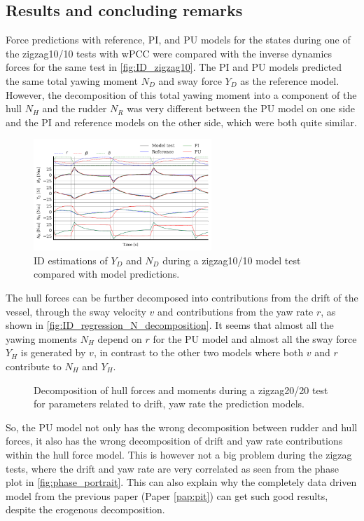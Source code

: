 \subsection*{Results and concluding remarks}
Force predictions with reference, PI, and PU models for the states during one of the zigzag10/10 tests with wPCC were compared with the inverse dynamics forces for the same test in \autoref{fig:ID_zigzag10}. The PI and PU models predicted the same total yawing moment $N_D$ and sway force $Y_D$ as the reference model. However, the decomposition of this total yawing moment into a component of the hull $N_H$ and the rudder $N_R$ was very different between the PU model on one side and the PI and reference models on the other side, which were both quite similar.
\begin{figure}[h]
    \centering
    \includegraphics[width=0.6\textwidth]{kappa/images/results.ID_zigzag10.pdf}
    \caption{ID estimations of $Y_D$ and $N_D$ during a zigzag10/10 model test compared with model predictions.}
    \label{fig:ID_zigzag10}
\end{figure}
The hull forces can be further decomposed into contributions from the drift of the vessel, through the sway velocity $v$ and contributions from the yaw rate $r$, as shown in \autoref{fig:ID_regression_N_decomposition}. It seems that almost all the yawing moments $N_H$ depend on $r$ for the PU model and almost all the sway force $Y_H$ is generated by $v$, in contrast to the other two models where both $v$ and $r$ contribute to $N_H$ and $Y_H$.
\begin{figure}[h]
    \begin{center}
        
        \caption{Decomposition of hull forces and moments during a zigzag20/20 test for parameters related to drift, yaw rate the prediction models.}
        \label{fig:ID_regression_N_decomposition}
    \end{center}
\end{figure}
So, the PU model not only has the wrong decomposition between rudder and hull forces, it also has the wrong decomposition of drift and yaw rate contributions within the hull force model. This is however not a big problem during the zigzag tests, where the drift and yaw rate are very correlated as seen from the phase plot in \autoref{fig:phase_portrait}. This can also explain why the completely data driven model from the previous paper (Paper \ref{pap:pit}) can get such good results, despite the erogenous decomposition.
